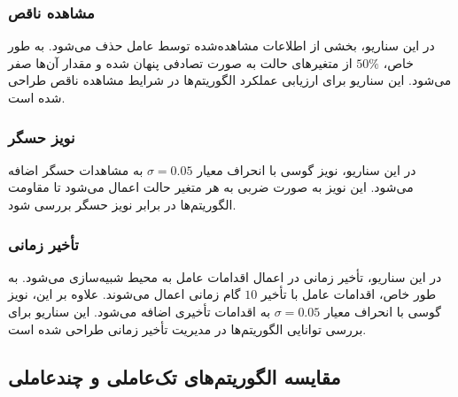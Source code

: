 \subsubsection{مشاهده ناقص}
در این سناریو، بخشی از اطلاعات مشاهده‌شده توسط عامل حذف می‌شود. به طور خاص، $50\%$ از متغیرهای حالت به صورت تصادفی پنهان شده و مقدار آن‌ها صفر می‌شود. این سناریو برای ارزیابی عملکرد الگوریتم‌ها در شرایط مشاهده ناقص طراحی شده است.

\subsubsection{نویز حسگر}
در این سناریو، نویز گوسی با انحراف معیار $\sigma = 0.05$ به مشاهدات حسگر اضافه می‌شود. این نویز به صورت ضربی به هر متغیر حالت اعمال می‌شود تا مقاومت الگوریتم‌ها در برابر نویز حسگر بررسی شود.

\subsubsection{تأخیر زمانی}
در این سناریو، تأخیر زمانی در اعمال اقدامات عامل به محیط شبیه‌سازی می‌شود. به طور خاص، اقدامات عامل با تأخیر $10$ گام زمانی اعمال می‌شوند. علاوه بر این، نویز گوسی با انحراف معیار $\sigma = 0.05$ به اقدامات تأخیری اضافه می‌شود. این سناریو برای بررسی توانایی الگوریتم‌ها در مدیریت تأخیر زمانی طراحی شده است.

\subsection{مقایسه الگوریتم‌های تک‌عاملی و چندعاملی }

